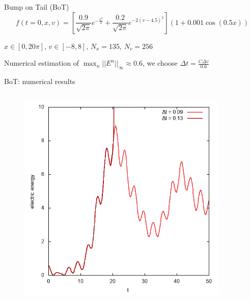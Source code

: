 \documentclass{beamer}
\begin{document}
\begin{frame}{Bump on Tail (BoT)}
  $$
    f(t=0,x,v) = \left[\frac{0.9}{\sqrt{2\pi}}e^{-\frac{v^2}{2}} + \frac{0.2}{\sqrt{2\pi}}e^{-2(v-4.5)^2} \right](1+0.001\cos(0.5x))
  $$

  $x\in[0,20\pi]$, $v\in[-8,8]$, $N_x = 135$, $N_v=256$

  Numerical estimation of $\max_n||E^n||_\infty\approx 0.6$, we choose $\Delta t = \frac{C\Delta v}{0.6}$
\end{frame}
\begin{frame}{BoT: numerical results}
    {
    \begin{columns}
      \begin{column}{0.5\textwidth}
        \begin{figure}
          \includegraphics[width=0.9\textwidth]{img/ee_weno_rk44.png}

\end{figure}
\end{column}
\end{columns}}
\end{frame}
\end{document}
